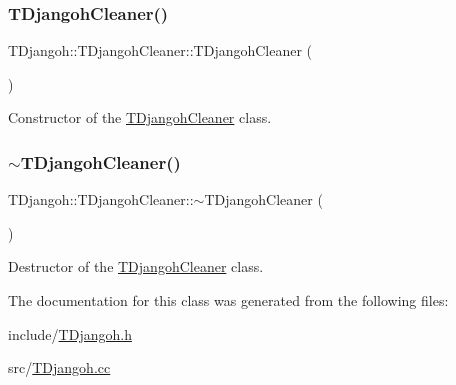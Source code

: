 \subsubsection{\texorpdfstring{T\+Djangoh\+Cleaner()}{TDjangohCleaner()}}
{\footnotesize\ttfamily T\+Djangoh\+::\+T\+Djangoh\+Cleaner\+::\+T\+Djangoh\+Cleaner (\begin{DoxyParamCaption}{ }\end{DoxyParamCaption})}



Constructor of the \hyperlink{class_t_djangoh_1_1_t_djangoh_cleaner}{T\+Djangoh\+Cleaner} class. 

\mbox{\label{class_t_djangoh_1_1_t_djangoh_cleaner_a0eee987a431011c09a263c8eaf85db5c}} 
\subsubsection{\texorpdfstring{$\sim$\+T\+Djangoh\+Cleaner()}{~TDjangohCleaner()}}
{\footnotesize\ttfamily T\+Djangoh\+::\+T\+Djangoh\+Cleaner\+::$\sim$\+T\+Djangoh\+Cleaner (\begin{DoxyParamCaption}{ }\end{DoxyParamCaption})}



Destructor of the \hyperlink{class_t_djangoh_1_1_t_djangoh_cleaner}{T\+Djangoh\+Cleaner} class. 



The documentation for this class was generated from the following files\+:\begin{DoxyCompactItemize}
\item 
include/\hyperlink{_t_djangoh_8h}{T\+Djangoh.\+h}\item 
src/\hyperlink{_t_djangoh_8cc}{T\+Djangoh.\+cc}\end{DoxyCompactItemize}
